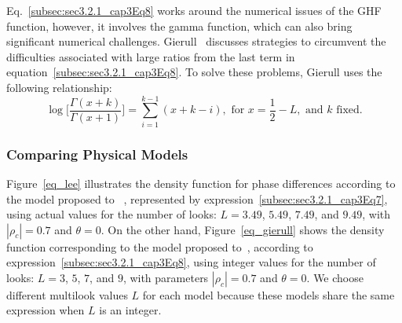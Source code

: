 \documentclass[remotesensing,article,submit,pdftex,moreauthors]{Definitions/mdpi}
\begin{document}
Eq.~\eqref{subsec:sec3.2.1_cap3Eq8} works around the numerical issues of the GHF function, however, it involves the gamma function, which can also bring significant numerical challenges.
Gierull~\cite{ClosedFormExpressionsforInSARSampleStatisticsandItsApplicationtoNonGaussianData} discusses strategies to circumvent the difficulties associated with large ratios from the last term in equation~\eqref{subsec:sec3.2.1_cap3Eq8}.
To solve these problems, Gierull uses the following relationship:
\begin{equation}\label{pro_log-gamma}
	\log\bigg[\frac{\Gamma(x+k)}{\Gamma(x+1)}\bigg]=\sum_{i=1}^{k-1}(x+k-i), \text{ for }x=\frac{1}{2}-L, \text{ and } k \text{ fixed}.
\end{equation}

\subsubsection{Comparing Physical Models}\label{subsec:lee_versus_gierull}



Figure~\ref{eq_lee} illustrates the density function for phase differences according to the model proposed to ~\cite{IntensityAndPhaseStatisticsOfMultilookPolarimetricAndInterferometricSARimagery}, represented by expression~\eqref{subsec:sec3.2.1_cap3Eq7}, using actual values for the number of looks: $L=3.49$, $5.49$, $7.49$, and $9.49$, with $|\rho_c|=0.7$ and $\theta=0$. On the other hand, Figure~\ref{eq_gierull} shows the density function corresponding to the model proposed to~\cite{ClosedFormExpressionsforInSARSampleStatisticsandItsApplicationtoNonGaussianData}, according to expression~\eqref{subsec:sec3.2.1_cap3Eq8}, using integer values for the number of looks: $L=3$, $5$, $7$, and $9$, with parameters $|\rho_c| = 0.7$ and $\theta = 0$. We choose different multilook values $L$ for each model because these models share the same expression when $L$ is an integer.
\end{document}
